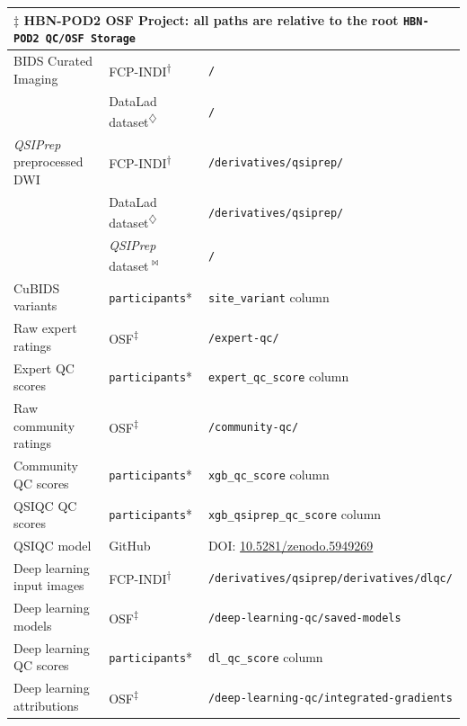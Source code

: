 \documentclass[fleqn,10pt,inline]{wlscirep}
\begin{document}
\begin{longtable}{p{4.0cm}p{2.9cm}p{9.3cm}}
\multicolumn{3}{l}{{$\ddagger$ HBN-POD2 OSF Project\cite{hbn-pod2-osf}: all paths are relative to the root \texttt{HBN-POD2 QC/OSF Storage}}} \\
\bottomrule
\endlastfoot
    BIDS Curated Imaging
        & FCP-INDI\textsuperscript{$\dagger$}
        & \texttt{/} \\
        & DataLad dataset\textsuperscript{$\diamondsuit$}
        & \texttt{/} \\
    \hline
    \emph{QSIPrep} preprocessed DWI
        & FCP-INDI\textsuperscript{$\dagger$}
        & \texttt{/derivatives/qsiprep/} \\
        & DataLad dataset\textsuperscript{$\diamondsuit$}
        & \texttt{/derivatives/qsiprep/} \\
        & \emph{QSIPrep} dataset\textsuperscript{$\Join$}
        & \texttt{/} \\
    \hline
    CuBIDS variants
        & \texttt{participants}*
        & \texttt{site\_variant} column  \\
    \hline
    Raw expert ratings
        & OSF\textsuperscript{$\ddagger$}
        & \texttt{/expert-qc/} \\
    \hline
    Expert QC scores
        & \texttt{participants}*
        & \texttt{expert\_qc\_score} column \\
    \hline
    Raw community ratings
        & OSF\textsuperscript{$\ddagger$}
        & \texttt{/community-qc/} \\
    \hline
    Community QC scores
        & \texttt{participants}*
        & \texttt{xgb\_qc\_score} column \\
    \hline
    QSIQC QC scores
        & \texttt{participants}*
        & \texttt{xgb\_qsiprep\_qc\_score} column \\
    \hline
    QSIQC model
        & GitHub
        & DOI: \href{https://doi.org/10.5281/zenodo.5949269}{10.5281/zenodo.5949269} \\
    \hline
    Deep learning input images
        & FCP-INDI\textsuperscript{$\dagger$}
        & \texttt{/derivatives/qsiprep/derivatives/dlqc/} \\
    \hline
    Deep learning models
        & OSF\textsuperscript{$\ddagger$}
        & \texttt{/deep-learning-qc/saved-models} \\
    \hline
    Deep learning QC scores
        & \texttt{participants}*
        & \texttt{dl\_qc\_score} column \\
    \hline
    Deep learning attributions
        & OSF\textsuperscript{$\ddagger$}
        & \texttt{/deep-learning-qc/integrated-gradients} \\

\end{longtable}
\end{document}
